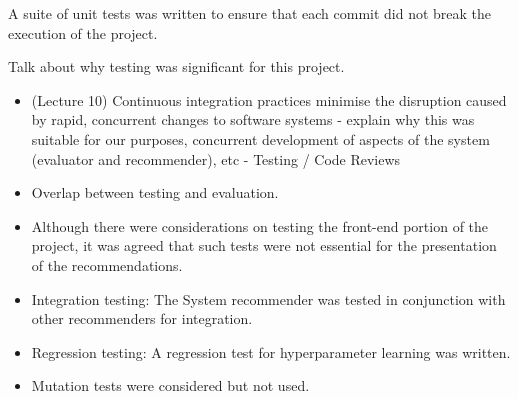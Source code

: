 \documentclass{l3proj}
\begin{document}
A suite of unit tests was written to ensure that each commit did not break the execution of the project.





% 

Talk about why testing was significant for this project.

\begin{itemize}
\item (Lecture 10) Continuous integration practices minimise the disruption caused by rapid, concurrent changes to software systems - explain why this was suitable for our purposes, concurrent development of aspects of the system (evaluator and recommender), etc - Testing / Code Reviews
\item Overlap between testing and evaluation.
\item Although there were considerations on testing the front-end portion of the project, it was agreed that such tests were not essential for the presentation of the recommendations.
\item Integration testing: The System recommender was tested in conjunction with other recommenders for integration.
\item Regression testing: A regression test for hyperparameter learning was written.
\item Mutation tests were considered but not used.
\end{itemize}
\end{document}
